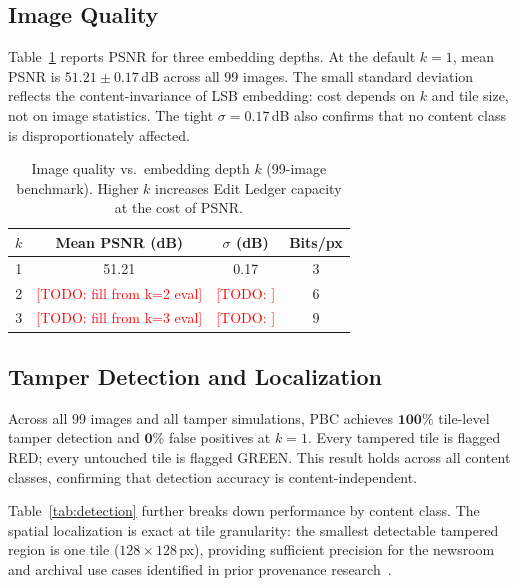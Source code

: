 \documentclass[conference]{IEEEtran}
\newcommand{\todo}[1]{\textcolor{red}{[TODO: #1]}}
\begin{document}
\subsection{Image Quality}

Table~\ref{tab:psnr} reports PSNR for three embedding depths. At the
default $k{=}1$, mean PSNR is $51.21 \pm 0.17$\,dB across all 99
images. The small standard deviation reflects the content-invariance
of LSB embedding: cost depends on $k$ and tile size, not on image
statistics. The tight $\sigma = 0.17$\,dB also confirms that no
content class is disproportionately affected.

\begin{table}[t]
  \centering
  \caption{Image quality vs.\ embedding depth $k$ (99-image benchmark).
    Higher $k$ increases Edit Ledger capacity at the cost of PSNR.}
  \label{tab:psnr}
  \begin{tabular}{cccc}
    \toprule
    $k$ & Mean PSNR (dB) & $\sigma$ (dB) & Bits/px \\
    \midrule
    1 & 51.21 & 0.17 & 3 \\
    2 & \todo{fill from k=2 eval} & \todo{} & 6 \\
    3 & \todo{fill from k=3 eval} & \todo{} & 9 \\
    \bottomrule
  \end{tabular}
\end{table}

\subsection{Tamper Detection and Localization}

Across all 99 images and all tamper simulations, PBC achieves
$\mathbf{100\%}$ tile-level tamper detection and $\mathbf{0\%}$ false
positives at $k{=}1$. Every tampered tile is flagged RED; every
untouched tile is flagged GREEN. This result holds across all content
classes, confirming that detection accuracy is content-independent.

Table~\ref{tab:detection} further breaks down performance by content
class. The spatial localization is exact at tile granularity: the
smallest detectable tampered region is one tile ($128 \times 128$\,px),
providing sufficient precision for the newsroom and archival use cases
identified in prior provenance research~\cite{sherman2021indicators,
feng2023provenance}.
\end{document}
